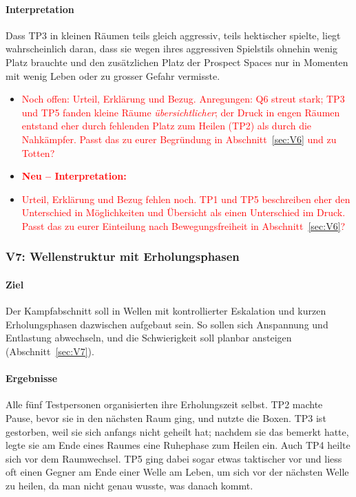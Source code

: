 \documentclass[../Main.tex]{subfiles}
\begin{document}
\paragraph{Interpretation}
Dass TP3 in kleinen Räumen teils gleich aggressiv, teils hektischer spielte, liegt wahrscheinlich daran, dass sie wegen ihres aggressiven Spielstils ohnehin wenig Platz brauchte und den zusätzlichen Platz der Prospect Spaces nur in Momenten mit wenig Leben oder zu grosser Gefahr vermisste.

\begin{itemize}[leftmargin=1.5cm]
    \item \textcolor{red}{Noch offen: Urteil, Erklärung und Bezug. Anregungen: Q6 streut stark; TP3 und TP5 fanden kleine Räume \emph{übersichtlicher}; der Druck in engen Räumen entstand eher durch fehlenden Platz zum Heilen (TP2) als durch die Nahkämpfer. Passt das zu eurer Begründung in Abschnitt~\ref{sec:V6} und zu Totten?}
\end{itemize}

\begin{itemize}[leftmargin=1.5cm]
    \item \textcolor{red}{\textbf{Neu -- Interpretation:}}
    \item \textcolor{red}{Urteil, Erklärung und Bezug fehlen noch. TP1 und TP5 beschreiben eher den Unterschied in Möglichkeiten und Übersicht als einen Unterschied im Druck. Passt das zu eurer Einteilung nach Bewegungsfreiheit in Abschnitt~\ref{sec:V6}?}
\end{itemize}

\subsubsection{V7: Wellenstruktur mit Erholungsphasen}

\paragraph{Ziel}
Der Kampfabschnitt soll in Wellen mit kontrollierter Eskalation und kurzen Erholungsphasen dazwischen aufgebaut sein. So sollen sich Anspannung und Entlastung abwechseln, und die Schwierigkeit soll planbar ansteigen (Abschnitt~\ref{sec:V7}).

\paragraph{Ergebnisse}
Alle fünf Testpersonen organisierten ihre Erholungszeit selbst. TP2 machte Pause, bevor sie in den nächsten Raum ging, und nutzte die Boxen. TP3 ist gestorben, weil sie sich anfangs nicht geheilt hat; nachdem sie das bemerkt hatte, legte sie am Ende eines Raumes eine Ruhephase zum Heilen ein. Auch TP4 heilte sich vor dem Raumwechsel. TP5 ging dabei sogar etwas taktischer vor und liess oft einen Gegner am Ende einer Welle am Leben, um sich vor der nächsten Welle zu heilen, da man nicht genau wusste, was danach kommt.
\end{document}
